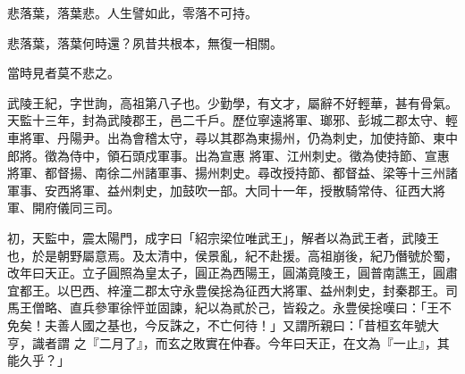 \begin{pinyinscope}
 悲落葉，落葉悲。人生譬如此，零落不可持。



 悲落葉，落葉何時還？夙昔共根本，無復一相關。



 當時見者莫不悲之。



 武陵王紀，字世詢，高祖第八子也。少勤學，有文才，屬辭不好輕華，甚有骨氣。天監十三年，封為武陵郡王，邑二千戶。歷位寧遠將軍、瑯邪、彭城二郡太守、輕車將軍、丹陽尹。出為會稽太守，尋以其郡為東揚州，仍為刺史，加使持節、東中郎將。徵為侍中，領石頭戍軍事。出為宣惠
 將軍、江州刺史。徵為使持節、宣惠將軍、都督揚、南徐二州諸軍事、揚州刺史。尋改授持節、都督益、梁等十三州諸軍事、安西將軍、益州刺史，加鼓吹一部。大同十一年，授散騎常侍、征西大將軍、開府儀同三司。



 初，天監中，震太陽門，成字曰「紹宗梁位唯武王」，解者以為武王者，武陵王也，於是朝野屬意焉。及太清中，侯景亂，紀不赴援。高祖崩後，紀乃僭號於蜀，改年曰天正。立子圓照為皇太子，圓正為西陽王，圓滿竟陵王，圓普南譙王，圓肅宜都王。以巴西、梓潼二郡太守永豊侯捴為征西大將軍、益州刺史，封秦郡王。司馬王僧略、直兵參軍徐怦並固諫，紀以為貳於己，皆殺之。永豊侯捴嘆曰：「王不免矣！夫善人國之基也，今反誅之，不亡何待！」又謂所親曰：「昔桓玄年號大亨，識者謂
 之『二月了』，而玄之敗實在仲春。今年曰天正，在文為『一止』，其能久乎？」




\end{pinyinscope}
